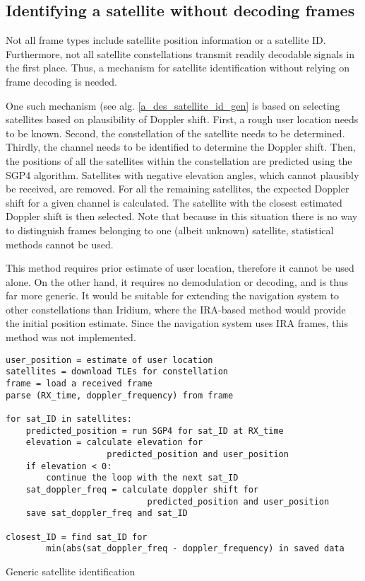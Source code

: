 \subsection{Identifying a satellite without decoding frames}
Not all frame types include satellite position information or a satellite ID. Furthermore, not all satellite constellations transmit readily decodable signals in the first place. Thus, a mechanism for satellite identification without relying on frame decoding is needed.

One such mechanism (see alg. \ref{a_des_satellite_id_gen} is based on selecting satellites based on plausibility of Doppler shift. First, a rough user location needs to be known. Second, the constellation of the satellite needs to be determined. Thirdly, the channel needs to be identified to determine the Doppler shift. Then, the positions of all the satellites within the constellation are predicted using the SGP4 algorithm. Satellites with negative elevation angles, which cannot plausibly be received, are removed. For all the remaining satellites, the expected Doppler shift for a given channel is calculated. The satellite with the closest estimated Doppler shift is then selected. Note that because in this situation there is no way to distinguish frames belonging to one (albeit unknown) satellite, statistical methods cannot be used.

This method requires prior estimate of user location, therefore it cannot be used alone. On the other hand, it requires no demodulation or decoding, and is thus far more generic. It would be suitable for extending the navigation system to other constellations than Iridium, where the IRA-based method would provide the initial position estimate. Since the navigation system uses IRA frames, this method was not implemented.

\begin{algorithm}
    \centering
    \begin{verbatim}
user_position = estimate of user location
satellites = download TLEs for constellation
frame = load a received frame
parse (RX_time, doppler_frequency) from frame

for sat_ID in satellites:
    predicted_position = run SGP4 for sat_ID at RX_time
    elevation = calculate elevation for
                    predicted_position and user_position
    if elevation < 0:
        continue the loop with the next sat_ID
    sat_doppler_freq = calculate doppler shift for
                            predicted_position and user_position
    save sat_doppler_freq and sat_ID

closest_ID = find sat_ID for
        min(abs(sat_doppler_freq - doppler_frequency) in saved data
    \end{verbatim}
    \caption{Generic satellite identification}
    \label{a_des_satellite_id_gen}
\end{algorithm}


